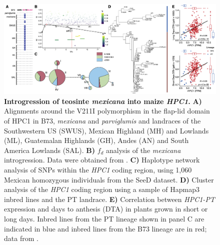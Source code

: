 \documentclass[9pt,twocolumn,twoside,lineno]{biorxiv}
\begin{document}
\begin{figure}[!ht]
\begin{center}
\includegraphics[width=0.8\paperwidth]{Figures/Fig_6.png}
\caption{\textbf{Introgression of teosinte \textit{mexicana} into maize \textit{HPC1}.}  
\textbf{A)} Alignments around the V211I polymorphism in the flap-lid domain of HPC1 in B73, \textit{mexicana} and \textit{parviglumis} and landraces of the Southwestern US (SWUS), Mexican Highland (MH) and Lowlands (ML), Guatemalan Highlands (GH), Andes (AN) and South America Lowlands (SAL).
\textbf{B)} \(f_d\) analysis of the \textit{mexicana} introgression. Data were obtained from \cite{Gonzalez-Segovia2019-jy}. 
\textbf{C)} Haplotype network analysis of SNPs within the \textit{HPC1} coding region, using 1,060 Mexican homozygous individuals from the SeeD dataset.
\textbf{D)} Cluster analysis of the \textit{HPC1} coding region using a sample of Hapmap3 inbred lines and the PT landrace.
\textbf{E)} Correlation between \textit{HPC1-PT} expression and days to anthesis (DTA) in plants grown in short or long days. 
Inbred lines from the PT lineage shown in panel C are indicated in blue and inbred lines from the B73 lineage are in red;
data from \cite{Kremling2018-gn}.}
\label{Fig6}
\end{center}
\end{figure}
 
\end{document}
